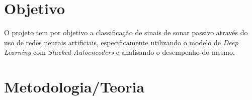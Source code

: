 \documentclass[]{report}
\begin{document}
\section*{Objetivo}
	O projeto tem por objetivo a classificação de sinais de sonar passivo através do uso de redes neurais artificiais, especificamente utilizando o modelo de \textit{Deep Learning} com \textit{Stacked Autoencoders} e analisando o desempenho do mesmo.
	\vspace{1.3cm}
	
\section*{Metodologia/Teoria}
\end{document}
